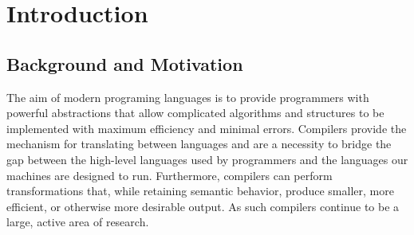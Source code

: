 \documentclass[12pt,a4paper,twoside,openright]{report}
\begin{document}
\begin{comment}
TODO

\section*{Work Completed}

TODO

\section*{Special Difficulties}

TODO
 
\newpage
\section*{Declaration}

I, Lawrence Esswood of Churchill College, being a candidate for Part II of the Computer
Science Tripos, hereby declare that this dissertation and the work described in it are my own work,
unaided except as may be specified below, and that the dissertation
does not contain material that has already been used to any substantial
extent for a comparable purpose.

\bigskip
\leftline{Signed [signature]}

\medskip
\leftline{Date [date]}

\tableofcontents

\listoffigures

\newpage
\section*{Acknowledgements}

TODO

\end{comment}

\pagestyle{headings}

\chapter{Introduction}

\section{Background and Motivation}

The aim of modern programing languages is to provide programmers with powerful abstractions that allow complicated algorithms and structures to be implemented with maximum efficiency and minimal errors. Compilers provide the mechanism for translating between languages and are a necessity to bridge the gap between the high-level languages used by programmers and the languages our machines are designed to run. Furthermore, compilers can perform transformations that, while retaining semantic behavior, produce smaller, more efficient, or otherwise more desirable output. As such compilers continue to be a large, active area of research.
\end{document}
